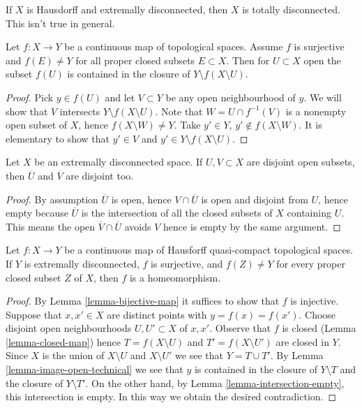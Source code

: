 \noindent
If $X$ is Hausdorff and extremally disconnected, then $X$ is totally
disconnected. This isn't true in general.

\begin{lemma}
\label{lemma-image-open-technical}
Let $f : X \to Y$ be a continuous map of topological spaces.
Assume $f$ is surjective and $f(E) \not = Y$ for all proper
closed subsets $E \subset X$. Then for $U \subset X$ open the subset
$f(U)$ is contained in the closure of $Y \setminus f(X \setminus U)$.
\end{lemma}

\begin{proof}
Pick $y \in f(U)$ and let $V \subset Y$ be any open neighbourhood of $y$.
We will show that $V$ intersects $Y \setminus f(X \setminus U)$.
Note that $W = U \cap f^{-1}(V)$ is a nonempty open subset of $X$, hence
$f(X \setminus W) \not = Y$. Take $y' \in Y$, $y' \not \in f(X \setminus W)$.
It is elementary to show that $y' \in V$ and
$y' \in Y \setminus f(X \setminus U)$.
\end{proof}

\begin{lemma}
\label{lemma-intersection-empty}
Let $X$ be an extremally disconnected space.
If $U, V \subset X$ are disjoint open subsets, then
$\overline{U}$ and $\overline{V}$ are disjoint too.
\end{lemma}

\begin{proof}
By assumption $\overline{U}$ is open, hence $V \cap \overline{U}$
is open and disjoint from $U$, hence empty because $\overline{U}$
is the intersection of all the closed subsets of $X$ containing $U$.
This means the open $\overline{V} \cap \overline{U}$ avoids $V$
hence is empty by the same argument.
\end{proof}

\begin{lemma}
\label{lemma-isomorphism}
Let $f : X \to Y$ be a continuous map of Hausforff quasi-compact
topological spaces. If $Y$ is extremally disconnected, $f$ is surjective,
and $f(Z) \not = Y$ for every proper closed subset $Z$ of $X$, then
$f$ is a homeomorphism.
\end{lemma}

\begin{proof}
By Lemma \ref{lemma-bijective-map} it suffices to show that $f$ is injective.
Suppose that $x, x' \in X$ are distinct points with $y = f(x) = f(x')$.
Choose disjoint open neighbourhoods $U, U' \subset X$ of $x, x'$.
Observe that $f$ is closed (Lemma \ref{lemma-closed-map}) hence
$T = f(X \setminus U)$ and $T' = f(X \setminus U')$ are closed in $Y$.
Since $X$ is the union of $X \setminus U$ and $X \setminus U'$ we see that
$Y = T \cup T'$. By Lemma \ref{lemma-image-open-technical} we
see that $y$ is contained in the closure of $Y \setminus T$ and
the closure of $Y \setminus T'$. On the other hand, by
Lemma \ref{lemma-intersection-empty},
this intersection is empty. In this way we obtain the desired contradiction.
\end{proof}

